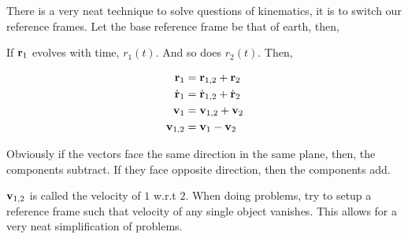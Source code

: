 There is a very neat technique to solve questions of kinematics, it is to switch our 
reference frames. Let the base reference frame be that of earth, then,

\begin{figure}
    [H]
    \centering
\end{figure}

If \(\boldsymbol{\mathbf{r}}_1\) evolves with time, \(r_1(t)\). And so does \(r_2(t)\). Then,

\begin{align*}
    \boldsymbol{\mathbf{r}}_1 &= \boldsymbol{\mathbf{r}}_{1,2} + \boldsymbol{\mathbf{r}}_2 \\
    \dot{\boldsymbol{\mathbf{r}}}_1 &= \dot{\boldsymbol{\mathbf{r}}}_{1,2} + \dot{\boldsymbol{\mathbf{r}}}_2 \\
    \boldsymbol{\mathbf{v}}_1 &= \boldsymbol{\mathbf{v}}_{1,2} + \boldsymbol{\mathbf{v}}_{2}\\
    \boldsymbol{\mathbf{v}}_{1,2} &= \boldsymbol{\mathbf{v}}_1 - \boldsymbol{\mathbf{v}}_{2}
\end{align*}

Obviously if the vectors face the same direction in the same plane, then, the components subtract. If they face
opposite direction, then the components add. 

\(\boldsymbol{\mathbf{v}}_{1,2}\) is called the velocity of \(\mathit{1}\) w.r.t \(\mathit{2}\). When doing
problems, try to setup a reference frame such that velocity of any single object vanishes.
This allows for a very neat simplification of problems. 


